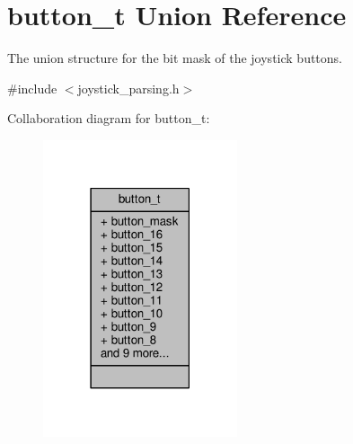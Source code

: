 \hypertarget{unionbutton__t}{\section{button\+\_\+t Union Reference}
\label{unionbutton__t}
}


The union structure for the bit mask of the joystick buttons.  




{\ttfamily \#include $<$joystick\+\_\+parsing.\+h$>$}



Collaboration diagram for button\+\_\+t\+:
\nopagebreak
\begin{figure}[H]
\begin{center}
\leavevmode
\includegraphics[width=162pt]{unionbutton__t__coll__graph}
\end{center}
\end{figure}
